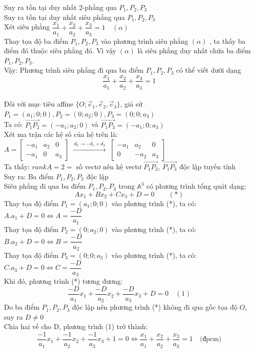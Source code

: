 \documentclass[12pt,a4paper]{article}
\begin{document}
\noindent Suy ra tồn tại duy nhất 2-phẳng qua \(P_1,P_2,P_3\) \\[4pt]
Suy ra tồn tại duy nhất siêu phẳng qua \(P_1,P_2,P_3\) \\[4pt]
Xét siêu phẳng \( \dfrac{x_1}{a_1} + \dfrac{x_2}{a_2} + \dfrac{x_3}{a_3} = 1 \quad (\alpha) \) \\[4pt]
Thay tọa độ ba điểm \( P_1, P_2, P_3 \) vào phương trình siêu phẳng \( (\alpha) \) , ta thấy ba điểm đó thuộc siêu phẳng đó. Vì vậy \( (\alpha) \) là siêu phẳng duy nhất chứa ba điểm \( P_1, P_2, P_3 \). \\[4pt]
Vậy: Phương trình siêu phẳng đi qua ba điểm \(P_1,P_2,P_3\) có thể viết dưới dạng \[ \dfrac{x_1}{a_1} + \dfrac{x_2}{a_2} + \dfrac{x_3}{a_3} = 1 \]
\setlength{\fboxsep}{6pt}
 \\[4pt]
Đối với mục tiêu affine \( \{O; \vec e_1, \vec e_2, \vec e_3\}  \), giả sử \( P_1=(a_1;0;0),P_2=(0;a_2;0),P_3=(0;0;a_3) \) \\[4pt]
Ta có: \( \overrightarrow{P_1P_2} =(-a_1;a_2;0)\) và \( \overrightarrow{P_1P_3} =(-a_1;0;a_3)\) \\[4pt]
Xét ma trận các hệ số của hệ trên là: \(
A=
\begin{bmatrix}
 -a_1 & a_2 & 0\\
 -a_1 & 0 & a_3
\end{bmatrix}
\;\xrightarrow{\,d_2 \rightarrow -d_1+d_2\,}\;
\begin{bmatrix}
 -a_1 & a_2 & 0\\
 0 & -a_2 & a_3
\end{bmatrix}
 \) \\[4pt]
Ta thấy: \( rankA=2= \) số vectơ nên hệ vectơ \( \overrightarrow{P_1P_2} \), \( \overrightarrow{P_1P_3} \) độc lập tuyến tính \\[4pt]
Suy ra: Ba điểm \( P_1, P_2, P_3 \) độc lập \\[4pt]
Siêu phẳng đi qua ba điểm $P_1, P_2, P_3$ trong $\mathbb{A}^3$ có phương trình tổng quát dạng: $$Ax_1 + Bx_2 + Cx_3 + D = 0 \qquad (*)$$
Thay tọa độ điểm \( P_1=(a_1;0;0) \) vào phương trình (*), ta có: \(
A.a_1+D=0 \Leftrightarrow A=\dfrac{-D}{a_1}
\) \\[4pt]
Thay tọa độ điểm \( P_2=(0;a_2;0) \) vào phương trình (*), ta có: \(
B.a_2+D=0 \Leftrightarrow B=\dfrac{-D}{a_2}
\) \\[4pt]
Thay tọa độ điểm \( P_3=(0;0;a_3) \) vào phương trình (*), ta có: \(
C.a_3+D=0 \Leftrightarrow C=\dfrac{-D}{a_3}
\) \\[4pt]
Khi đó, phương trình (*) tương đương: \[
\dfrac{-D}{a_1}x_1+\dfrac{-D}{a_2}x_2+\dfrac{-D}{a_3}x_3+D=0 \quad (1)
\]
Do ba điểm \( P_1,P_2,P_3 \) độc lập nên phương trình (*) không đi qua gốc tọa độ \( O\), suy ra \(D \neq 0 \) \\[4pt]
Chia hai vế cho D, phương trình (1) trở thành: \[
\dfrac{-1}{a_1}x_1+\dfrac{-1}{a_2}x_2+\dfrac{-1}{a_3}x_3+1=0 \Leftrightarrow \frac{x_1}{a_1} + \frac{x_2}{a_2} + \frac{x_3}{a_3} = 1 \quad \text{(đpcm)}
\]
\end{document}
